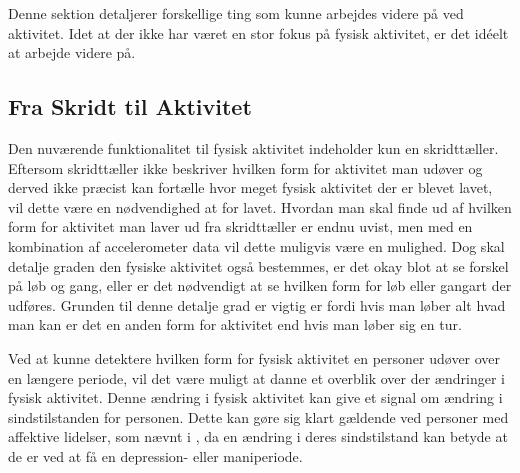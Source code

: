 Denne sektion detaljerer forskellige ting som kunne arbejdes videre på ved aktivitet.
Idet at der ikke har været en stor fokus på fysisk aktivitet, er det idéelt at arbejde videre på.

\subsection{Fra Skridt til Aktivitet}
Den nuværende funktionalitet til fysisk aktivitet indeholder kun en skridttæller.
Eftersom skridttæller ikke beskriver hvilken form for aktivitet man udøver og derved ikke præcist kan fortælle hvor meget fysisk aktivitet der er blevet lavet, vil dette være en nødvendighed at for lavet.
Hvordan man skal finde ud af hvilken form for aktivitet man laver ud fra skridttæller er endnu uvist, men med en kombination af accelerometer data vil dette muligvis være en mulighed.
Dog skal detalje graden den fysiske aktivitet også bestemmes, er det okay blot at se forskel på løb og gang, eller er det nødvendigt at se hvilken form for løb eller gangart der udføres.
Grunden til denne detalje grad er vigtig er fordi hvis man løber alt hvad man kan er det en anden form for aktivitet end hvis man løber sig en tur.

Ved at kunne detektere hvilken form for fysisk aktivitet en personer udøver over en længere periode, vil det være muligt at danne et overblik over der ændringer i fysisk aktivitet.
Denne ændring i fysisk aktivitet kan give et signal om ændring i sindstilstanden for personen.
Dette kan gøre sig klart gældende ved personer med affektive lidelser, som nævnt i \citet[Kapitel 1, Sektion 4]{misc:faellesrapp}, da en ændring i deres sindstilstand kan betyde at de er ved at få en depression- eller maniperiode.

\begin{comment}
Den nuværende funktionalitet til fysisk aktivitet er kun en skridttæller, fra denne vil det næste logiske skridt være at lave noget der kan give et overblik over hvor meget fysisk aktivitet der har været ud fra antallet af skridt.
Helt præcist hvordan dette skal gøres og vises er uvist, men der er en mulighed for at det skulle kombineres med accelerometer data til at afgøre om der er tale om løb, gang eller anden form for bevægelse.
De forskellige gang typer skal så også fortolkes som forskellige form for aktivitet. 
Det ville også være nødvendigt at beslutte hvad for en enhed fysisk aktivitet er i, er det i Joule forbrændt eller noget andet?

Udover at beslutte hvordan fysisk aktivitet skal bestemmes skal man også beslutte sig for hvad det skal bruges til.
I sammenhæng med det primære fokus vi har på affektive lidelser, vil et oplagt fokus være at se på ændringer i mængden af fysisk aktivitet, da det giver et signal om ændringer i sindstilstand for patienter med affektive lidelser, hvilket også blev nævnt i \citet[Kapitel 1, Sektion 4]{misc:faellesrapp}.
\end{comment}
